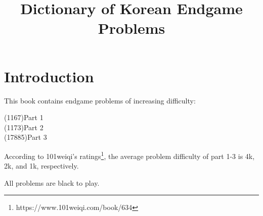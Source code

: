 \title{Dictionary of Korean Endgame Problems}

\chapter*{Introduction}%
\thispagestyle{empty}%
This book contains \countproblems{} endgame problems of increasing difficulty:

(1167)\:\:Part 1\\
(1173)\:\:Part 2\\
(17885)\:\:Part 3

According to 101weiqi's ratings\footnote{https://www.101weiqi.com/book/634}, the average problem difficulty of part 1-3 is 4k, 2k, and 1k, respectively.

All problems are black to play.

\renderproblems
\rendersolutions


